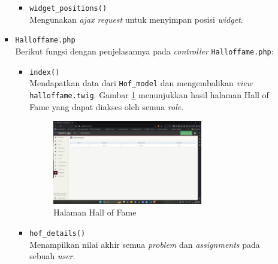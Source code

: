 \documentclass[a4paper,twoside]{article}
\begin{document}
\begin{enumerate}
\begin{itemize}
\begin{itemize}
\begin{itemize}
				                  \item \verb|widget_positions()| \\
				                        Mengunakan \textit{ajax request} untuk menyimpan posisi \textit{widget}.


			                  \end{itemize}

			            \item \verb|Halloffame.php| \\
			                  Berikut fungsi dengan penjelasannya pada \textit{controller} \verb|Halloffame.php|:

			                  \begin{itemize}
				                  \item \verb|index()| \\
				                        Mendapatkan data dari \verb|Hof_model| dan mengembalikan \textit{view} \verb|halloffame.twig|. Gambar \ref{fig:3:1:1:hof} menunjukkan hasil halaman Hall of Fame yang dapat diakses oleh semua \textit{role}.

				                        \begin{figure}[H]
					                        \centering
					                        \includegraphics[width=0.75\textwidth]{views/hof.png}
					                        \caption{Halaman Hall of Fame}
					                        \label{fig:3:1:1:hof}
				                        \end{figure}

				                  \item \verb|hof_details()| \\
				                        Menampilkan nilai akhir semua \textit{problem} dan \textit{assignments} pada sebuah \textit{user}.

			                  \end{itemize}


\end{itemize}
\end{itemize}
\end{enumerate}
\end{document}
